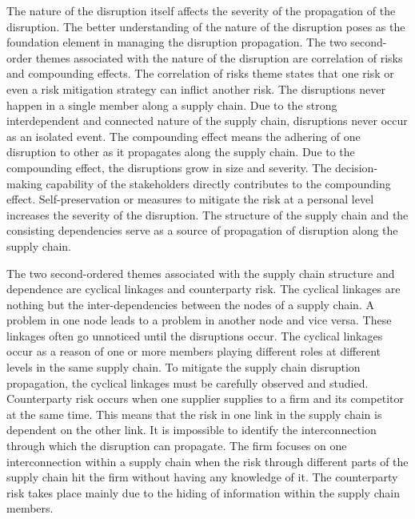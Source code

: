The nature of the disruption itself affects the severity of the propagation of the disruption. The better understanding of the nature of the disruption poses as the foundation element in managing the disruption propagation. The two second-order themes associated with the nature of the disruption are correlation of risks and compounding effects. The correlation of risks theme states that one risk or even a risk mitigation strategy can inflict another risk. The disruptions never happen in a single member along a supply chain. Due to the strong interdependent and connected nature of the supply chain, disruptions never occur as an isolated event. The compounding effect means the adhering of one disruption to other as it propagates along the supply chain. Due to the compounding effect, the disruptions grow in size and severity. The decision-making capability of the stakeholders directly contributes to the compounding effect. Self-preservation or measures to mitigate the risk at a personal level increases the severity of the disruption. The structure of the supply chain and the consisting dependencies serve as a source of propagation of disruption along the supply chain.

The two second-ordered themes associated with the supply chain structure and dependence are cyclical linkages and counterparty risk. The cyclical linkages are nothing but the inter-dependencies between the nodes of a supply chain. A problem in one node leads to a problem in another node and vice versa. These linkages often go unnoticed until the disruptions occur. The cyclical linkages occur as a reason of one or more members playing different roles at different levels in the same supply chain. To mitigate the supply chain disruption propagation, the cyclical linkages must be carefully observed and studied. Counterparty risk occurs when one supplier supplies to a firm and its competitor at the same time. This means that the risk in one link in the supply chain is dependent on the other link. It is impossible to identify the interconnection through which the disruption can propagate. The firm focuses on one interconnection within a supply chain when the risk through different parts of the supply chain hit the firm without having any knowledge of it. The counterparty risk takes place mainly due to the hiding of information within the supply chain members. 

